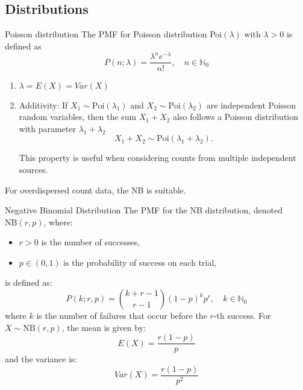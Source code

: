 \subsection*{Distributions}
\begin{note}
    {Poisson distribution}\label{note:poisson-distribution}
    The \gls{PMF} for Poisson distribution Poi\((\lambda)\) with \(\lambda > 0\) is defined as
    \begin{equation}\label{eq:poisson-pmf}
        P(n;\lambda) = \frac{\lambda^n e^{-\lambda}}{n!}, \quad n \in \mathbb{N}_0
    \end{equation}
    \begin{enumerate}
        \item $\lambda = E(X) = Var(X)$ 
        \item Additivity: If $X_1 \sim \text{Poi}(\lambda_1)$ and $X_2 \sim \text{Poi}(\lambda_2)$ are independent Poisson random variables, then the sum $X_1 + X_2$ also follows a Poisson distribution with parameter $\lambda_1 + \lambda_2$
        \begin{equation}
            X_1 + X_2 \sim \text{Poi}(\lambda_1 + \lambda_2).
        \end{equation}
        
        This property is useful when considering counts from multiple independent sources.
    \end{enumerate}
\end{note}

For overdispersed count data, the \gls{NB} is suitable. 

\begin{note}
    {Negative Binomial Distribution}\label{note:negative-binomial-distribution}
    The \gls{PMF} for the \gls{NB} distribution, denoted $\text{NB}(r, p)$, where:
    \begin{itemize}
        \item $r > 0$ is the number of successes,
        \item $p \in (0, 1)$ is the probability of success on each trial,
    \end{itemize}
    is defined as:
    \begin{equation}\label{eq:nb-pmf}
        P(k; r, p) = \binom{k+r-1}{r-1} (1-p)^k p^r, \quad k \in \mathbb{N}_0
    \end{equation}
    where $k$ is the number of failures that occur before the $r$-th success.
    For $X \sim \text{NB}(r, p)$, the mean is given by:
        \begin{equation}
            E(X) = \frac{r(1-p)}{p}
        \end{equation}
        and the variance is:
        \begin{equation}
            Var(X) = \frac{r(1-p)}{p^2}
        \end{equation}

\end{note}


